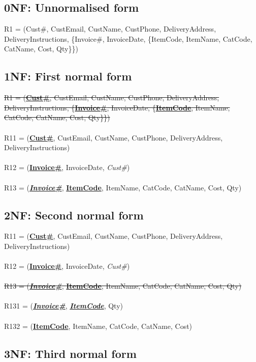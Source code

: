 \subsection{0NF: Unnormalised form}

R1 = (Cust\#, CustEmail, CustName, CustPhone, DeliveryAddress, DeliveryInstructions, \{Invoice\#, InvoiceDate, \{ItemCode, ItemName, CatCode, CatName, Cost, Qty\}\})

\subsection{1NF: First normal form}

\sout{R1 = (\textbf{\underline{Cust\#}}, CustEmail, CustName, CustPhone, DeliveryAddress, DeliveryInstructions, \{\textbf{\underline{Invoice\#}}, InvoiceDate, \{\textbf{\underline{ItemCode}}, ItemName, CatCode, CatName, Cost, Qty\}\})}
\\\\
R11 = (\textbf{\underline{Cust\#}}, CustEmail, CustName, CustPhone, DeliveryAddress, DeliveryInstructions)
\\\\
R12 = (\textbf{\underline{Invoice\#}}, InvoiceDate, \emph{Cust\#})
\\\\
R13 = (\textbf{\underline{\emph{Invoice\#}}}, \textbf{\underline{ItemCode}}, ItemName, CatCode, CatName, Cost, Qty)

\subsection{2NF: Second normal form}

R11 = (\textbf{\underline{Cust\#}}, CustEmail, CustName, CustPhone, DeliveryAddress, DeliveryInstructions)
\\\\
R12 = (\textbf{\underline{Invoice\#}}, InvoiceDate, \emph{Cust\#})
\\\\
\sout{R13 = (\textbf{\underline{\emph{Invoice\#}}}, \textbf{\underline{ItemCode}}, ItemName, CatCode, CatName, Cost, Qty)}
\\\\
R131 = (\textbf{\underline{\emph{Invoice\#}}}, \textbf{\underline{\emph{ItemCode}}}, Qty)
\\\\
R132 = (\textbf{\underline{ItemCode}}, ItemName, CatCode, CatName, Cost)

\subsection{3NF: Third normal form}

